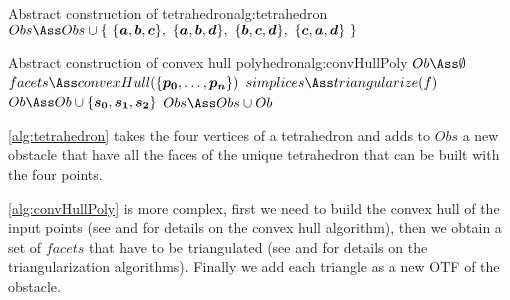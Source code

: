 \documentclass[dissertation.tex]{subfiles}
\begin{document}
\begin{algo}{Abstract construction of tetrahedron}{alg:tetrahedron}
  \State $Obs\Ass Obs\cup\{\ \{\ve{a},\ve{b},\ve{c}\},\ \{\ve{a},\ve{b},\ve{d}\},\ \{\ve{b},\ve{c},\ve{d}\},\ \{\ve{c},\ve{a},\ve{d}\}\ \}$
  \EndProcedure
\end{algo}
\begin{algo}{Abstract construction of convex hull
    polyhedron}{alg:convHullPoly}
  \State $Ob\Ass\emptyset$
  \State $facets\Ass convexHull(\{\ve{p_0},\dots,\ve{p_n}\})$
  \State $simplices\Ass triangularize(f)$
  \State $Ob\Ass Ob\cup\{\ve{s_0},\ve{s_1},\ve{s_2}\}$
  \EndFor
  \EndFor
  \State $Obs\Ass Obs\cup Ob$
  \EndProcedure
\end{algo}
\cref{alg:tetrahedron} takes the four vertices of a tetrahedron
and adds to $Obs$ a new obstacle that have all the faces of the
unique tetrahedron that can be built with the four
points.

\cref{alg:convHullPoly} is more complex, first we need to build the
convex hull of the input points (see \cite{deberg} and \cite{press}
for details on the 
convex hull algorithm), then we obtain a set of $facets$ that have to
be triangulated (see \cite{deberg} and \cite{press} for details on the
triangularization
algorithms). Finally we add each triangle as a new \ac{OTF} of the
obstacle.
\end{document}
